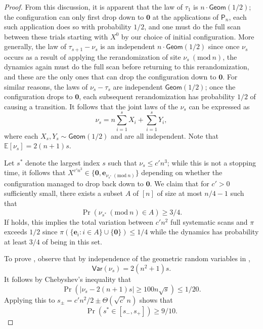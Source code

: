 \documentclass[11pt]{article}
\newcommand{\Mod}[1]{\ (\mathrm{mod}\ #1)}
\begin{document}
\begin{proof}
    From this discussion, it is apparent that the law of $\tau_1$ is $n\cdot \mathsf{Geom}(1/2)$; the configuration can only first drop down to $\bm{0}$ at the applications of $\mathsf{P}_n$, each such application does so with probability $1/2$, and one must do the full scan between these trials starting with $X^0$ by our choice of initial configuration. More generally, the law of $\tau_{s+1}-\nu_s$ is an independent $n\cdot \mathsf{Geom}(1/2)$ since once $\nu_s$ occurs as a result of applying the rerandomization of site $\nu_s\Mod n$, the dynamics again must do the full scan before returning to this rerandomization, and these are the only ones that can drop the configuration down to $\bm{0}$. For similar reasons, the laws of $\nu_s-\tau_s$ are independent $\mathsf{Geom}(1/2)$; once the configuration drops to $\bm{0}$, each subsequent rerandomization has probability $1/2$ of causing a transition. It follows that the joint laws of the $\nu_s$ can be expressed as
    \begin{equation}
    \label{eq:law}
        \nu_s = n\sum_{i=1}^s X_i+\sum_{i=1}^{s} Y_i,
    \end{equation}
    where each $X_s,Y_s\sim \mathsf{Geom}(1/2)$ and are all independent. Note that $\mathbb{E}[\nu_s]=2(n+1)s$.

    Let $s^*$ denote the largest index $s$ such that $\nu_s\leq c'n^3$; while this is not a stopping time, it follows that $X^{c'n^3}\in \{\bm{0},\bm{e}_{\nu_{s^*}\Mod n}\}$ depending on whether the configuration managed to drop back down to $\bm{0}$. We claim that for $c'>0$ sufficiently small, there exists a subset $A$ of $[n]$ of size at most $n/4-1$ such that 
    \begin{equation}
    \label{eq:st_concentration}
        \Pr\left(\nu_{s^*}\Mod n\in A\right)\geq 3/4.
    \end{equation}
    If  holds, this implies the total variation between $c'n^2$ full systematic scans and $\pi$ exceeds $1/2$ since $\pi(\{\bm{e}_i:i\in A\}\cup \{\bm{0}\})\leq 1/4$ while the dynamics has probability at least $3/4$ of being in this set.

    To prove , observe that by independence of the geometric random variables in ,
    \begin{equation*}
        \mathsf{Var}(\nu_s)=2(n^2+1)s.
    \end{equation*}
    It follows by Chebyshev's inequality that
    \begin{equation*}
    \Pr\left(\vert \nu_s-2(n+1)s\vert \geq 100n\sqrt{s}\right)\leq 1/20.
    \end{equation*}
    Applying this to $s_{\pm}=c'n^2/2\pm \Theta(\sqrt{c'}n)$ shows that
    \begin{equation}
    \label{eq:good_s}
        \Pr(s^*\in [s_-,s_+])\geq 9/10.
    \end{equation}


\end{proof}
\end{document}
